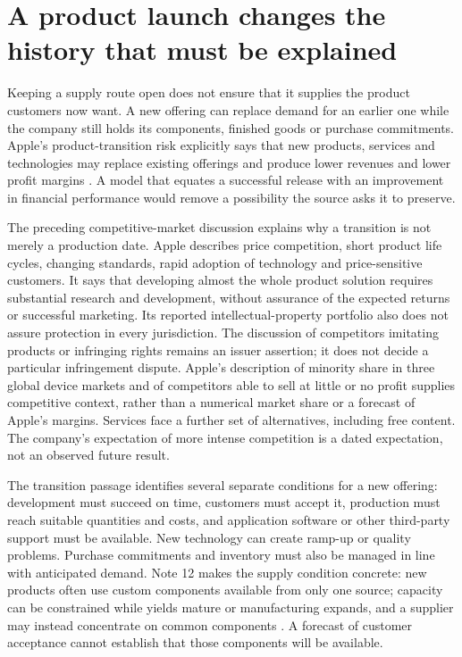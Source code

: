 \section{A product launch changes the history that must be explained}
\label{sec:apple-competition-transition}

Keeping a supply route open does not ensure that it supplies the product
customers now want. A new offering can replace demand for an earlier one while
the company still holds its components, finished goods or purchase commitments.
Apple's product-transition risk explicitly says that new products, services
and technologies may replace existing offerings and produce lower revenues
and lower profit margins \citep[Risk Factors, printed p.~7]{apple2024}.
A model that equates a successful release with an improvement in financial
performance would remove a possibility the source asks it to preserve.

The preceding competitive-market discussion explains why a transition is not
merely a production date. Apple describes price competition, short product
life cycles, changing standards, rapid adoption of technology and price-sensitive
customers. It says that developing almost the whole product solution requires
substantial research and development, without assurance of the expected returns
or successful marketing. Its reported intellectual-property portfolio also
does not assure protection in every jurisdiction. The discussion of competitors
imitating products or infringing rights remains an issuer assertion; it does
not decide a particular infringement dispute. Apple's description of minority
share in three global device markets and of competitors able to sell at little
or no profit supplies competitive context, rather than a numerical market
share or a forecast of Apple's margins. Services face a further set of
alternatives, including free content. The company's expectation of more
intense competition is a dated expectation, not an observed future result.

The transition passage identifies several separate conditions for a new
offering: development must succeed on time, customers must accept it, production
must reach suitable quantities and costs, and application software or other
third-party support must be available. New technology can create ramp-up or
quality problems. Purchase commitments and inventory must also be managed in
line with anticipated demand. Note 12 makes the supply condition concrete:
new products often use custom components available from only one source;
capacity can be constrained while yields mature or manufacturing expands,
and a supplier may instead concentrate on common components
\citep[Note 12, printed p.~46]{apple2024}. A forecast of customer acceptance
cannot establish that those components will be available.

